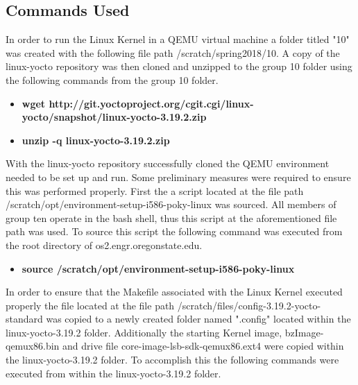 \documentclass[10pt,onecolumn,draftclsnofoot]{IEEEtran} %
\begin{document}
\newpage
\begin{singlespace}
\section{\bf  Commands Used}

  \normalfont \indent In order to run the Linux Kernel in a QEMU virtual machine a folder titled "10" was created with the following file path /scratch/spring2018/10. A copy of the linux-yocto repository was then cloned and unzipped to the group 10 folder using the following commands from the group 10 folder.
\hfill\break

  \begin{itemize}
    \item \textbf{wget http://git.yoctoproject.org/cgit.cgi/linux-yocto/snapshot/linux-yocto-3.19.2.zip }
    \item \textbf{unzip -q linux-yocto-3.19.2.zip}
  \end{itemize}
\hfill\break

  \normalfont \indent With the linux-yocto repository successfully cloned the QEMU environment needed to be set up and run. Some preliminary measures were required to ensure this was performed properly. First the a script located at the file path /scratch/opt/environment-setup-i586-poky-linux was sourced. All members of group ten operate in the bash shell, thus this script at the aforementioned file path was used. To source this script the following command was executed from the root directory of os2.engr.oregonstate.edu.

\hfill\break
  \begin{itemize}
    \item \textbf{source /scratch/opt/environment-setup-i586-poky-linux}
  \end{itemize}
\hfill\break
  \normalfont \indent In order to ensure that the Makefile associated with the Linux Kernel executed properly the file located at the file path /scratch/files/config-3.19.2-yocto-standard was copied to a newly created folder named ".config" located within the linux-yocto-3.19.2 folder. Additionally the starting Kernel image, bzImage-qemux86.bin and drive file core-image-lsb-sdk-qemux86.ext4 were copied within the linux-yocto-3.19.2 folder. To accomplish this the following commands were executed from within the linux-yocto-3.19.2 folder.


\end{singlespace}
\end{document}
